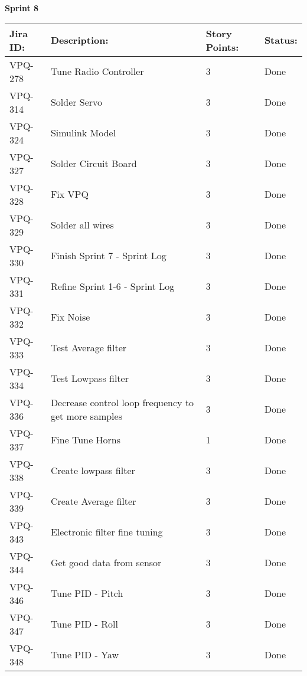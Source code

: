 \begin{table}[ht]
\centering\textbf{Sprint 8}
\begin{tabularx}{\linewidth}{|m{1.5cm} m{8.3cm} m{1.5cm} m{3.5cm}|}
\hline
    \rowcolor{cadetgrey} 
     \textbf{Jira ID:} & \textbf{Description:} &  \textbf{Story Points:} & \textbf{Status: } \\ \hline
      VPQ-278 & Tune Radio Controller & 3\centering & Done  \\ 
\rowcolor{gainsboro} VPQ-314 & Solder Servo & 3\centering & Done  \\
      VPQ-324 & Simulink Model & 3\centering & Done  \\
\rowcolor{gainsboro} VPQ-327 & Solder Circuit Board & 3\centering & Done  \\
      VPQ-328 & Fix VPQ & 3\centering & Done  \\
\rowcolor{gainsboro} VPQ-329 & Solder all wires & 3\centering & Done  \\
      VPQ-330 & Finish Sprint 7 - Sprint Log & 3\centering & Done  \\
\rowcolor{gainsboro} VPQ-331 &  Refine Sprint 1-6 - Sprint Log & 3\centering & Done  \\    
      VPQ-332 & Fix Noise & 3\centering & Done \\
\rowcolor{gainsboro}  VPQ-333 & Test Average filter & 3\centering & Done  \\
      VPQ-334 & Test Lowpass filter & 3\centering & Done  \\
\rowcolor{gainsboro}  VPQ-336 & Decrease control loop frequency to get more samples  & 3\centering & Done  \\
      VPQ-337 & Fine Tune Horns & 1\centering & Done  \\
\rowcolor{gainsboro}  VPQ-338 &  Create lowpass filter & 3\centering & Done  \\
      VPQ-339 & Create Average filter & 3\centering & Done  \\
\rowcolor{gainsboro}  VPQ-343 & Electronic filter fine tuning & 3\centering & Done  \\
      VPQ-344 & Get good data from sensor & 3\centering & Done  \\
\rowcolor{gainsboro}  VPQ-346 & Tune PID - Pitch & 3\centering & Done  \\
      VPQ-347 & Tune PID - Roll & 3\centering & Done  \\
\rowcolor{gainsboro}  VPQ-348 & Tune PID - Yaw & 3\centering & Done  \\

\end{tabularx}
\end{table}
